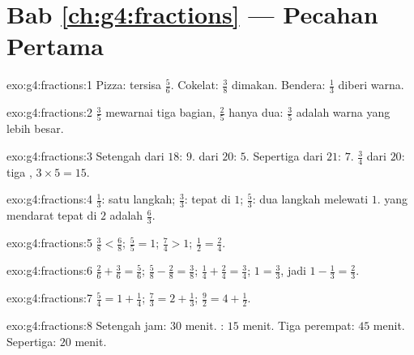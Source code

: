 \section*{Bab \ref{ch:g4:fractions} --- Pecahan Pertama}

\begin{solution}{exo:g4:fractions:1}
Pizza: tersisa $\frac56$. Cokelat: $\frac38$ dimakan. Bendera:
$\frac13$ diberi warna.
\end{solution}

\begin{solution}{exo:g4:fractions:2}
$\frac35$ mewarnai tiga bagian, $\frac25$ hanya dua: $\frac35$
adalah warna yang lebih besar.
\end{solution}

\begin{solution}{exo:g4:fractions:3}
Setengah dari $18$: $9$.  dari $20$: $5$. Sepertiga dari
$21$: $7$. $\frac34$ dari $20$: tiga , $3 \times 5 = 15$.
\end{solution}

\begin{solution}{exo:g4:fractions:4}
$\frac13$: satu langkah; $\frac33$: tepat di $1$; $\frac53$: dua
langkah melewati $1$.  yang mendarat tepat di $2$ adalah $\frac63$.
\end{solution}

\begin{solution}{exo:g4:fractions:5}
$\frac38 < \frac68$; \quad $\frac55 = 1$; \quad $\frac74 > 1$;
\quad $\frac12 = \frac24$.
\end{solution}

\begin{solution}{exo:g4:fractions:6}
$\frac26 + \frac36 = \frac56$; \quad
$\frac58 - \frac28 = \frac38$; \quad
$\frac14 + \frac24 = \frac34$; \quad
$1 = \frac33$, jadi $1 - \frac13 = \frac23$.
\end{solution}

\begin{solution}{exo:g4:fractions:7}
$\frac54 = 1 + \frac14$; \quad
$\frac73 = 2 + \frac13$; \quad
$\frac92 = 4 + \frac12$.
\end{solution}

\begin{solution}{exo:g4:fractions:8}
Setengah jam: $30$ menit. : $15$ menit. Tiga perempat:
$45$ menit. Sepertiga: $20$ menit.
\end{solution}

